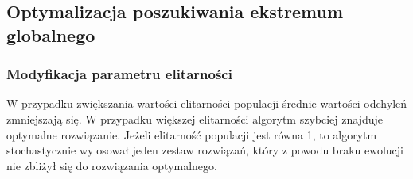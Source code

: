 \documentclass{article}
\begin{document}
    \subsection{Optymalizacja poszukiwania ekstremum globalnego}

\subsubsection{Modyfikacja parametru elitarności}

W przypadku zwiększania wartości elitarności populacji średnie wartości odchyleń zmniejszają się. W przypadku większej elitarności algorytm szybciej znajduje optymalne rozwiązanie. Jeżeli elitarność populacji jest równa 1, to algorytm stochastycznie wylosował jeden zestaw rozwiązań, który z powodu braku ewolucji nie zbliżył się do rozwiązania optymalnego.
\end{document}
